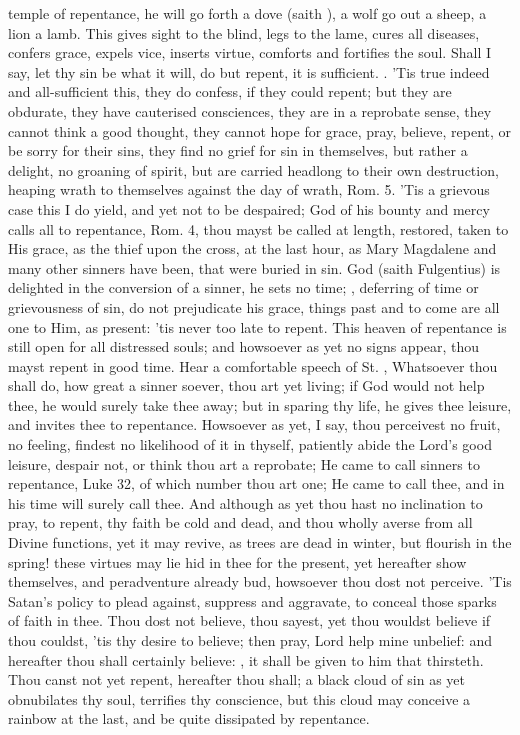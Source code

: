 {temple of repentance, he will go forth a dove (saith \Chrysostom{}),
a wolf go out a sheep, a lion a lamb. This gives sight to the
blind, legs to the lame, cures all diseases, confers grace, expels
vice, inserts virtue, comforts and fortifies the soul. Shall I say, let
thy sin be what it will, do but repent, it is sufficient. . 'Tis true indeed and
all-sufficient this, they do confess, if they could repent; but they
are obdurate, they have cauterised consciences, they are in a reprobate
sense, they cannot think a good thought, they cannot hope for grace,
pray, believe, repent, or be sorry for their sins, they find no grief
for sin in themselves, but rather a delight, no groaning of spirit, but
are carried headlong to their own destruction, heaping wrath to
themselves against the day of wrath, Rom.  5. 'Tis a grievous case
this I do yield, and yet not to be despaired; God of his bounty and
mercy calls all to repentance, Rom.  4, thou mayst be called at
length, restored, taken to His grace, as the thief upon the cross, at
the last hour, as Mary Magdalene and many other sinners have been, that
were buried in sin. God (saith Fulgentius) is delighted in the
conversion of a sinner, he sets no time; , deferring of time or grievousness of
sin, do not prejudicate his grace, things past and to come are all one
to Him, as present: 'tis never too late to repent. This heaven of
repentance is still open for all distressed souls; and howsoever as yet
no signs appear, thou mayst repent in good time. Hear a comfortable
speech of St. \Austin{}, Whatsoever thou shall do, how great a
sinner soever, thou art yet living; if God would not help thee, he
would surely take thee away; but in sparing thy life, he gives thee
leisure, and invites thee to repentance. Howsoever as yet, I say, thou
perceivest no fruit, no feeling, findest no likelihood of it in
thyself, patiently abide the Lord's good leisure, despair not, or think
thou art a reprobate; He came to call sinners to repentance, Luke 
32, of which number thou art one; He came to call thee, and in his time
will surely call thee. And although as yet thou hast no inclination to
pray, to repent, thy faith be cold and dead, and thou wholly averse
from all Divine functions, yet it may revive, as trees are dead in
winter, but flourish in the spring! these virtues may lie hid in thee
for the present, yet hereafter show themselves, and peradventure
already bud, howsoever thou dost not perceive. 'Tis Satan's policy to
plead against, suppress and aggravate, to conceal those sparks of faith
in thee. Thou dost not believe, thou sayest, yet thou wouldst believe
if thou couldst, 'tis thy desire to believe; then pray, Lord help
mine unbelief: and hereafter thou shall certainly believe:
, it shall be given to him that thirsteth. Thou
canst not yet repent, hereafter thou shall; a black cloud of sin as yet
obnubilates thy soul, terrifies thy conscience, but this cloud may
conceive a rainbow at the last, and be quite dissipated by repentance.

}
